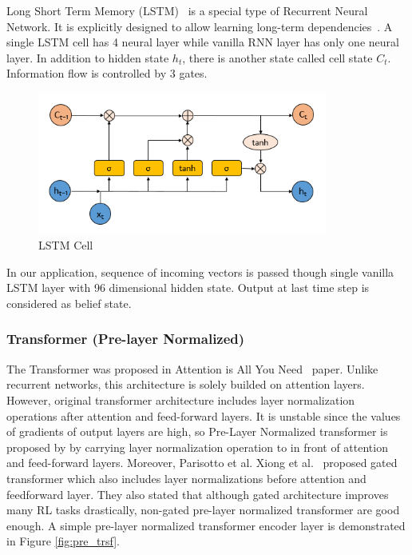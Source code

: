 \documentclass[a4paper, 12pt]{article} %
\begin{document}
Long Short Term Memory (LSTM)~\cite{hochreiter_long_1997} is a special type of Recurrent Neural Network. 
It is explicitly designed to allow learning long-term dependencies~\cite{olah_understanding_2015}. 
A single LSTM cell has 4 neural layer while vanilla RNN layer has only one neural layer. 
In addition to hidden state $h_t$, there is another state called cell state $C_t$. 
Information flow is controlled by 3 gates. 

\begin{figure}
	\centering
	\includegraphics[width=0.85\textwidth]{figures/ml_theory/lstm_cell.png}
	\caption{LSTM Cell}
	\label{fig:lstm_cell}
\end{figure}

In our application, sequence of incoming vectors is passed though single vanilla LSTM layer with 96 dimensional hidden state. 
Output at last time step is considered as belief state. 

\subsubsection{Transformer (Pre-layer Normalized)}

The Transformer was proposed in Attention is All You Need~ \cite{vaswani_attention_2017} paper. 
Unlike recurrent networks, this architecture is solely builded on attention layers. 
However, original transformer architecture includes layer normalization operations after attention and feed-forward layers. 
It is unstable since the values of gradients of output layers are high, so Pre-Layer Normalized transformer is proposed by \cite{xiong_layer_2020} by carrying layer normalization operation to in front of attention and feed-forward layers. 
Moreover, Parisotto et al. Xiong et al.~ \cite{parisotto_stabilizing_2019} proposed gated transformer which also includes layer normalizations before attention and feedforward layer. 
They also stated that although gated architecture improves many RL tasks drastically, non-gated pre-layer normalized transformer are good enough. 
A simple pre-layer normalized transformer encoder layer is demonstrated in Figure \ref{fig:pre_trsf}.
\end{document}
